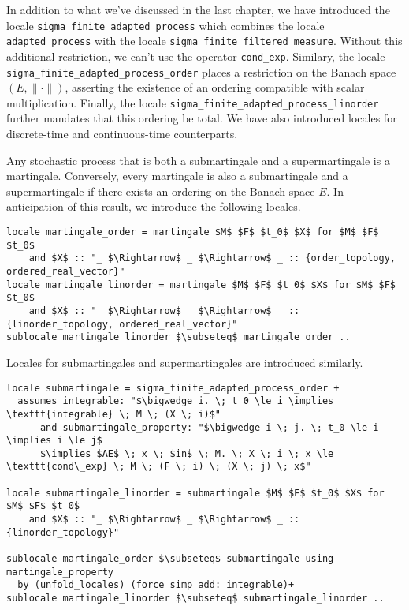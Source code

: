 \begin{remark}
 In addition to what we've discussed in the last chapter, we have introduced the locale \texttt{sigma\_finite\_adapted\_process} which combines the locale \texttt{adapted\_process} with the locale \texttt{sigma\_finite\_filtered\_measure}. Without this additional restriction, we can't use the operator \texttt{cond\_exp}. Similary, the locale \texttt{sigma\_finite\_adapted\_process\_order} places a restriction on the Banach space $(E, \lVert \cdot \rVert)$, asserting the existence of an ordering compatible with scalar multiplication. Finally, the locale \texttt{sigma\_finite\_adapted\_process\_linorder} further mandates that this ordering be total. We have also introduced locales for discrete-time and continuous-time counterparts.
\end{remark}

Any stochastic process that is both a submartingale and a supermartingale is a martingale. Conversely, every martingale is also a submartingale and a supermartingale if there exists an ordering on the Banach space $E$. In anticipation of this result, we introduce the following locales.

\begin{isadefinition}
{\small
\begin{lstlisting}[style=isabelle]
locale martingale_order = martingale $M$ $F$ $t_0$ $X$ for $M$ $F$ $t_0$
	and $X$ :: "_ $\Rightarrow$ _ $\Rightarrow$ _ :: {order_topology, ordered_real_vector}"
locale martingale_linorder = martingale $M$ $F$ $t_0$ $X$ for $M$ $F$ $t_0$
	and $X$ :: "_ $\Rightarrow$ _ $\Rightarrow$ _ :: {linorder_topology, ordered_real_vector}"
sublocale martingale_linorder $\subseteq$ martingale_order ..
\end{lstlisting}
}
\end{isadefinition}

Locales for submartingales and supermartingales are introduced similarly.

\begin{isadefinition}
{\small
\begin{lstlisting}[style=isabelle]
locale submartingale = sigma_finite_adapted_process_order +
  assumes integrable: "$\bigwedge i. \; t_0 \le i \implies \texttt{integrable} \; M \; (X \; i)$"
      and submartingale_property: "$\bigwedge i \; j. \; t_0 \le i \implies i \le j$
	  $\implies $AE$ \; x \; $in$ \; M. \; X \; i \; x \le \texttt{cond\_exp} \; M \; (F \; i) \; (X \; j) \; x$"
	  
locale submartingale_linorder = submartingale $M$ $F$ $t_0$ $X$ for $M$ $F$ $t_0$ 
	and $X$ :: "_ $\Rightarrow$ _ $\Rightarrow$ _ :: {linorder_topology}"

sublocale martingale_order $\subseteq$ submartingale using martingale_property
  by (unfold_locales) (force simp add: integrable)+
sublocale martingale_linorder $\subseteq$ submartingale_linorder ..
\end{lstlisting}
}
\end{isadefinition}

